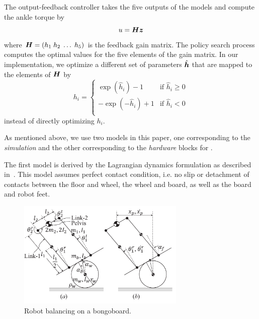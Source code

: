 \documentclass[letterpaper, 10 pt, conference]{ieeeconf}
\begin{document}
The output-feedback controller takes the five outputs of the models and
compute the ankle torque by
\begin{equation}
u = \mbox{\boldmath \(H\)} \mbox{\boldmath \(z\)}
\end{equation}
where $\mbox{\boldmath \(H\)} = \left(h_1\; h_2\; \ldots\; h_5\right)$ is the
feedback gain matrix.
The policy search process computes the optimal values for the five
elements of the gain matrix. 
In our implementation, we optimize a different set of parameters
$\hat{\mbox{\boldmath \(h\)}}$ that are mapped to the elements of $\mbox{\boldmath \(H\)}$ by 
\begin{equation}
h_i = \left\{ 
\begin{array}{cc}
\exp(\hat{h}_i)-1 & \mbox{if }\hat{h}_i \geq 0 \\
-\exp(-\hat{h}_i)+1 & \mbox{if }\hat{h}_i < 0 \\
\end{array}
\right.
\end{equation}
instead of directly optimizing $h_i$.

As mentioned above, we use two models in this paper, one corresponding
to the {\em simulation} and the other corresponding to the {\em
hardware} blocks for .

The first model is derived by the Lagrangian dynamics formulation as
described in~\cite{bib-icra14-universal}.  This model assumes perfect
contact condition, i.e. no slip or detachment of contacts between the
floor and wheel, the wheel and board, as well as the board and robot
feet.

\begin{figure}[tb]
\begin{center}
\includegraphics[width=80mm]{eps/dynamicModelNOutputs.pdf}
\caption{Robot balancing on a bongoboard.}
\label{fig:learning_bongoboard}
\end{center}
\end{figure}

\end{document}
